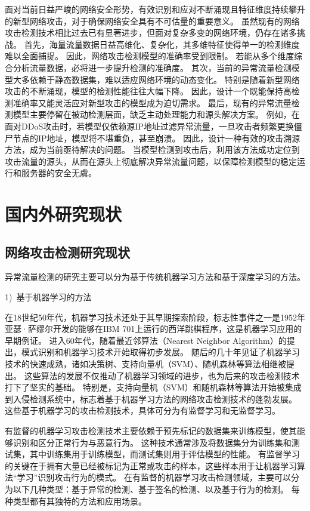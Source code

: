 面对当前日益严峻的网络安全形势，有效识别和应对不断涌现且特征维度持续攀升的新型网络攻击，对于确保网络安全具有不可估量的重要意义。
虽然现有的网络攻击检测技术相比过去已有显著进步，但面对复杂多变的网络环境，仍存在诸多挑战。
首先，海量流量数据日益高维化、复杂化，其多维特征使得单一的检测维度难以全面捕捉。
因此，网络攻击检测模型的准确率受到限制。
若能从多个维度综合分析流量数据，必将进一步提升检测的准确度。
其次，当前的异常流量检测模型大多依赖于静态数据集，难以适应网络环境的动态变化。
特别是随着新型网络攻击的不断涌现，模型的检测性能往往大幅下降。
因此，设计一个既能保持高检测准确率又能灵活应对新型攻击的模型成为迫切需求。
最后，现有的异常流量检测模型主要停留在被动检测层面，缺乏主动处理能力和源头解决方案。
例如，在面对DDoS攻击时，若模型仅依赖源IP地址过滤异常流量，一旦攻击者频繁更换僵尸节点的IP地址，模型将不堪重负，甚至崩溃。
因此，设计一种有效的攻击溯源方法，成为当前亟待解决的问题。
当模型检测到攻击后，利用该方法成功定位到攻击流量的源头，从而在源头上彻底解决异常流量问题，以保障检测模型的稳定运行和服务器的安全无虞。

\section{国内外研究现状}

\subsection{网络攻击检测研究现状}
异常流量检测的研究主要可以分为基于传统机器学习方法和基于深度学习的方法。\par
1)~基于机器学习的方法\par
在18世纪50年代，机器学习技术还处于其早期探索阶段，标志性事件之一是1952年亚瑟·萨缪尔开发的能够在IBM 701上运行的西洋跳棋程序，这是机器学习应用的早期例证。
进入60年代，随着最近邻算法（Nearest Neighbor Algorithm）\cite{cover1967nearest}的提出，模式识别和机器学习技术开始取得初步发展。
随后的几十年见证了机器学习技术的快速成熟，诸如决策树\cite{Quinlan1986}、支持向量机（SVM）\cite{Cortes1995}、随机森林\cite{Breiman2001}等算法相继被提出。
这些算法的发展不仅推动了机器学习领域的进步，也为后来的攻击检测技术打下了坚实的基础。
特别是，支持向量机（SVM）和随机森林等算法开始被集成到入侵检测系统中，标志着基于机器学习方法的网络攻击检测技术的蓬勃发展\cite{Mukkamala2002}。
这些基于机器学习的攻击检测技术，具体可分为有监督学习和无监督学习。



有监督的机器学习攻击检测技术主要依赖于预先标记的数据集来训练模型，使其能够识别和区分正常行为与恶意行为。
这种技术通常涉及将数据集分为训练集和测试集，其中训练集用于训练模型，而测试集则用于评估模型的性能。
有监督学习的关键在于拥有大量已经被标记为正常或攻击的样本，这些样本用于让机器学习算法“学习”识别攻击行为的模式。
在有监督的机器学习攻击检测领域，主要可以分为以下几种类型：基于异常的检测、基于签名的检测、以及基于行为的检测。
每种类型都有其独特的方法和应用场景。


